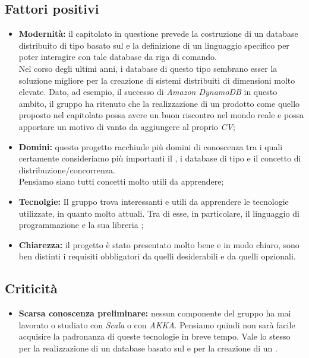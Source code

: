 \documentclass{scalatekids-article}
\begin{document}
\subsection{Fattori positivi}
\begin{itemize}
\item \textbf{Modernità:} il capitolato in questione prevede la costruzione di un database  distribuito di tipo  basato sul  e la definizione di un linguaggio specifico per poter interagire con tale database da riga di comando.\\
  Nel corso degli ultimi anni, i database di questo tipo sembrano esser la soluzione migliore per la creazione di sistemi distribuiti di dimensioni molto elevate. Dato, ad esempio, il successo di \textit{Amazon DynamoDB} in questo ambito, il gruppo ha ritenuto che la realizzazione di un prodotto come quello proposto nel capitolato possa avere un buon riscontro nel mondo reale e possa apportare un motivo di vanto da aggiungere al proprio \textit{CV};
\item \textbf{Domini:} questo progetto racchiude più domini di conoscenza tra i quali certamente consideriamo più importanti il , i database  di tipo  e il concetto di distribuzione/concorrenza. \\
  Pensiamo siano tutti concetti molto utili da apprendere;
\item \textbf{Tecnolgie:} Il gruppo trova interessanti e utili da apprendere le tecnologie utilizzate, in quanto molto attuali. Tra di esse, in particolare, il linguaggio di programmazione \textit{} e la sua libreria \textit{};
\item \textbf{Chiarezza:} il progetto è stato presentato molto bene e in modo chiaro, sono ben distinti i requisiti obbligatori da quelli desiderabili e da quelli opzionali.
\end{itemize}
\subsection{Criticità}
\begin{itemize}
\item \textbf{Scarsa conoscenza preliminare:} nessun componente del gruppo ha mai lavorato o studiato con \textit{Scala} o con \textit{AKKA}. Pensiamo quindi non sarà facile acquisire la padronanza di queste tecnologie in breve tempo.
  Vale lo stesso per la realizzazione di un database basato sul  e per la creazione di un .
\end{itemize}
\end{document}

